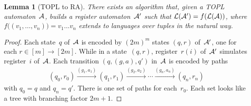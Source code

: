 \documentclass{article} %
\newtheorem{lemma}{Lemma}
\theoremstyle{definition}
\theoremstyle{remark}
\begin{document}
\begin{lemma}[TOPL to RA]\label{lemma:topl-to-ra}
There exists an algorithm that, given a TOPL automaton~${\cal A}$, builds a register automaton~${\cal A}'$ such that ${\cal L}({\cal A}')=f({\cal L}({\cal A}))$, where $f\bigl((v_1,\ldots,v_n)\bigr)=v_1\ldots v_n$ extends to languages over tuples in the natural way.
\end{lemma}
\begin{proof}
Each state~$q$ of~${\cal A}$ is encoded by $(2m)^m$ states $(q,r)$ of~${\cal A}'$, one for each $r\in[m]\to[2m]$.
While in a state~$(q, r)$, register~$r(i)$ of~${\cal A}'$ simulates register~$i$ of~${\cal A}$.
Each transition $(q,(g,a),q')$ in~${\cal A}$ is encoded by paths
\begin{align*}
(q_0,r_0)\xrightarrow{(g_1,a_1)}(q_1,r_1)\xrightarrow{(g_2,a_2)}\cdots\xrightarrow{(g_n,a_n)}(q_n,r_n)
\end{align*}
with $q_0=q$ and $q_n=q'$.
There is one set of paths for each~$r_0$.
Each set looks like a tree with branching factor $2m+1$.
\end{proof}
\end{document}
